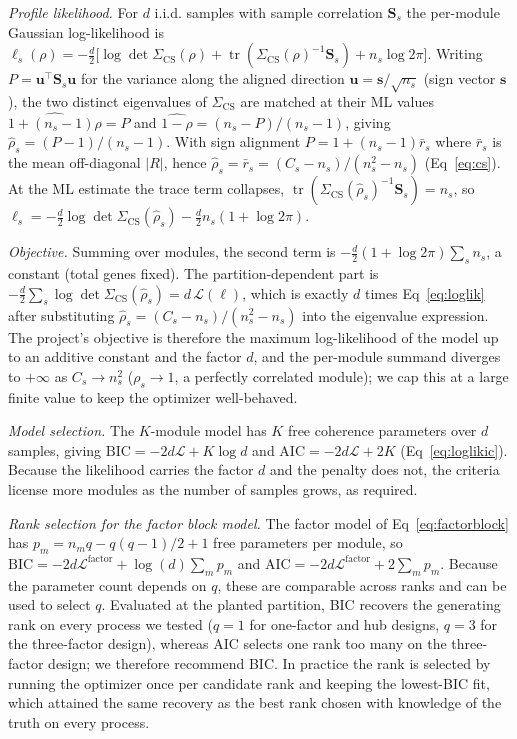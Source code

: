\emph{Profile likelihood.} For $d$ i.i.d. samples with sample correlation
$\mathbf{S}_s$ the per-module Gaussian log-likelihood is
$\ell_s(\rho)=-\tfrac{d}{2}\big[\log\det\Sigma_{\mathrm{CS}}(\rho)+\operatorname{tr}(\Sigma_{\mathrm{CS}}(\rho)^{-1}\mathbf{S}_s)+n_s\log 2\pi\big]$.
Writing $P=\mathbf{u}^{\!\top}\mathbf{S}_s\mathbf{u}$ for the variance along the
aligned direction $\mathbf{u}=\mathbf{s}/\sqrt{n_s}$ (sign vector $\mathbf{s}$),
the two distinct eigenvalues of $\Sigma_{\mathrm{CS}}$ are matched at their ML
values $\widehat{1+(n_s-1)\rho}=P$ and $\widehat{1-\rho}=(n_s-P)/(n_s-1)$,
giving $\hat\rho_s=(P-1)/(n_s-1)$. With sign alignment
$P=1+(n_s-1)\bar r_s$ where $\bar r_s$ is the mean off-diagonal $\lvert R\rvert$,
hence $\hat\rho_s=\bar r_s=(C_s-n_s)/(n_s^2-n_s)$ (Eq~\eqref{eq:cs}). At the ML
estimate the trace term collapses, $\operatorname{tr}(\Sigma_{\mathrm{CS}}(\hat\rho_s)^{-1}\mathbf{S}_s)=n_s$,
so
$\ell_s=-\tfrac{d}{2}\log\det\Sigma_{\mathrm{CS}}(\hat\rho_s)-\tfrac{d}{2}n_s(1+\log 2\pi)$.

\emph{Objective.} Summing over modules, the second term is
$-\tfrac{d}{2}(1+\log 2\pi)\sum_s n_s$, a constant (total genes fixed). The
partition-dependent part is
$-\tfrac{d}{2}\sum_s\log\det\Sigma_{\mathrm{CS}}(\hat\rho_s)=d\,\mathcal{L}(\boldsymbol{\ell})$,
which is exactly $d$ times Eq~\eqref{eq:loglik} after substituting
$\hat\rho_s=(C_s-n_s)/(n_s^2-n_s)$ into the eigenvalue expression. The project's
objective is therefore the maximum log-likelihood of the model up to an additive
constant and the factor $d$, and the per-module summand diverges to $+\infty$ as
$C_s\to n_s^2$ ($\rho_s\to1$, a perfectly correlated module); we cap this at a
large finite value to keep the optimizer well-behaved.

\emph{Model selection.} The $K$-module model has $K$ free coherence parameters
over $d$ samples, giving $\mathrm{BIC}=-2d\mathcal{L}+K\log d$ and
$\mathrm{AIC}=-2d\mathcal{L}+2K$ (Eq~\eqref{eq:loglikic}). Because the likelihood
carries the factor $d$ and the penalty does not, the criteria license more
modules as the number of samples grows, as required.

\emph{Rank selection for the factor block model.} The factor model of
Eq~\eqref{eq:factorblock} has $p_m = n_m q - q(q-1)/2 + 1$ free parameters per
module, so $\mathrm{BIC}=-2d\mathcal{L}^{\text{factor}}+\log(d)\sum_m p_m$ and
$\mathrm{AIC}=-2d\mathcal{L}^{\text{factor}}+2\sum_m p_m$. Because the parameter
count depends on $q$, these are comparable across ranks and can be used to select
$q$. Evaluated at the planted partition, BIC recovers the generating rank on every
process we tested ($q=1$ for one-factor and hub designs, $q=3$ for the
three-factor design), whereas AIC selects one rank too many on the three-factor
design; we therefore recommend BIC. In practice the rank is selected by running
the optimizer once per candidate rank and keeping the lowest-BIC fit, which
attained the same recovery as the best rank chosen with knowledge of the truth on
every process.

